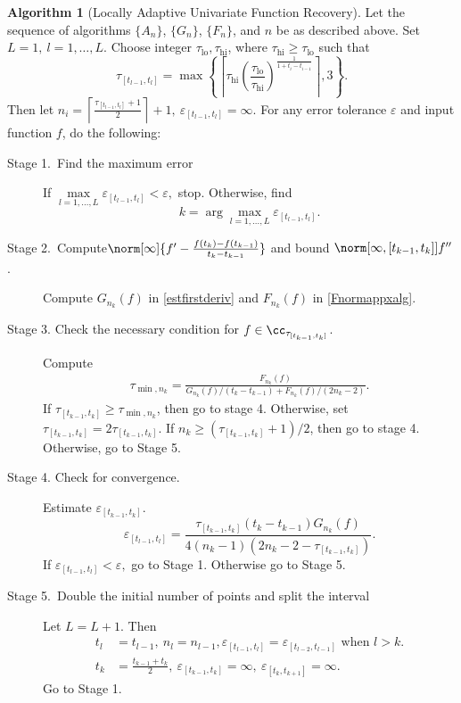\documentclass[]{elsarticle}
\DeclareMathOperator{\lo}{lo}
\theoremstyle{definition}
\newtheorem{algo}{Algorithm}
\theoremstyle{remark}
\begin{document}
\begin{algo}[Locally Adaptive Univariate Function Recovery] \label{multistageapproalgo}
Let the sequence of algorithms $\{A_n\}$, $\{G_n\}$,  $\{F_n\}$, and $n$  be as described above. Set $L=1, \ l =1,\ldots,L$.
Choose integer $\tau_{\lo}, \tau_{\text{hi}}$, where $\tau_{\text{hi}} \ge \tau_{\lo}$ such that
$$\tau_{[t_{l-1},t_l]} = \max\left\{ \left\lceil \tau_{\text{hi}} \left(\frac{\tau_{\lo}}{\tau_{\text{hi}}}\right)^{\frac{1}{1+t_i-t_{i-1}}} \right\rceil ,3\right\}.$$
Then let $n_i= \left\lceil\frac{\tau_{[t_{l-1},t_l]}+1}{2}  \right\rceil+1, \ \varepsilon_{[t_{l-1},t_l]}=\infty.$ For any error tolerance $\varepsilon$ and input function $f$, do the following:
\begin{description}
\item[Stage 1.\ Find the maximum error] If $\max\limits_{l=1,\ldots,L}\varepsilon_{[t_{l-1},t_l]} < \varepsilon,$ stop.
Otherwise, find
$$k = \arg\max\limits_{l=1,\ldots,L}\varepsilon_{[t_{l-1},t_l]}.$$
\item[Stage 2.\ Compute{$\norm[\infty]{f'-\frac{f(t_k)-f(t_{k-1})}{t_k-t_{k-1}}}$} and bound {$\norm[\infty,{[t_{k-1},t_k]}]{f''}$}.] Compute $G_{n_k}(f)$ in \eqref{estfirstderiv} and $F_{n_k}(f)$ in \eqref{Fnormappxalg}.
\item[Stage 3. Check the necessary condition for $f \in \cc_{\tau_{[t_{k-1},t_k]}}$.] Compute
    \begin{align*}
     \tau_{\min,n_k} =  \frac{F_{n_k}(f)}{G_{n_k}(f)/(t_k-t_{k-1})+F_{n_k}(f)/(2n_k-2)}.
    \end{align*}
If $\tau_{[t_{k-1},t_k]} \ge \tau_{\min,n_k}$, then go to stage 4.  Otherwise, set $\tau_{[t_{k-1},t_k]} = 2\tau_{[t_{k-1},t_k]}$.  If $n_k \ge (\tau_{[t_{k-1},t_k]}+1)/2$, then go to stage 4.  Otherwise, go to Stage 5.
\item[Stage 4. Check for convergence.] Estimate $\varepsilon_{[t_{k-1},t_k]}.$
$$\varepsilon_{[t_{l-1},t_l]}=\frac{\tau_{[t_{k-1},t_k]}(t_k-t_{k-1})G_{n_k}(f)}{4(n_k-1)(2n_k-2 - \tau_{[t_{k-1},t_k]})}.$$
If $\varepsilon_{[t_{l-1},t_l]} < \varepsilon ,$ go to Stage 1. Otherwise go to Stage 5.
\item[Stage 5.\ Double the initial number of points and split the interval]
Let $L=L+1.$ Then
\begin{align*}
t_l&=t_{l-1}, \ n_l=n_{l-1},  \varepsilon_{[t_{l-1},t_l]}=\varepsilon_{[t_{l-2},t_{l-1}]} \text{ when } l > k.\\
t_k&=\frac{t_{k-1}+t_k}{2}, \ \varepsilon_{[t_{k-1},t_k]}=\infty, \ \varepsilon_{[t_k,t_{k+1}]}=\infty.
\end{align*}
Go to Stage 1.
\end{description}
\end{algo}
\end{document}
